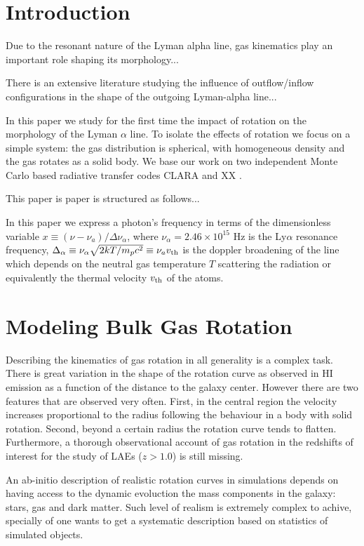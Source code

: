\documentclass[usenatbib]{mn2e}
\begin{document}
\section{Introduction}
\label{sec:intro}



Due to the resonant nature of the Lyman alpha line, gas kinematics
play an important role shaping its morphology...

There is an extensive literature studying the influence of
outflow/inflow configurations in the shape of the outgoing Lyman-alpha
line...

In this paper we study for the first time the impact of rotation on
the morphology of the Lyman $\alpha$ line. To isolate the effects of
rotation we focus on a simple system: the gas distribution is
spherical, with homogeneous density and the gas rotates as a solid
body. We base our work on two independent Monte Carlo based radiative
transfer codes CLARA \citep{CLARA} and XX \citep{DijkstraKramer}.

 
This paper is paper is structured as follows...

In this paper we express a photon's frequency in terms of the
dimensionless variable $x\equiv (\nu -\nu_a)/\Delta\nu_\alpha$, where
$\nu_{\alpha}=2.46\times 10^{15}$ Hz is the Ly$\alpha$ resonance
frequency,  $\Delta_{\alpha} \equiv
\nu_{\alpha}\sqrt{2kT/m_pc^2}\equiv \nu_av_{\rm th} $ is the doppler
broadening of the line which depends on the neutral gas temperature
$T$ scattering the radiation or equivalently the thermal velocity
$v_{\rm th}$ of the atoms.


\section{Modeling Bulk Gas Rotation}
\label{sec:implementation}

Describing the kinematics of gas rotation in all generality is a
complex task. There is great variation in the shape of the rotation
curve as observed in HI emission as a function of the distance to the
galaxy center. However there are two features that are observed very
often. First, in the central region the velocity increases
proportional to the radius following the behaviour in a body with
solid rotation. Second, beyond a certain radius the rotation curve
tends to flatten. Furthermore, a thorough observational account of gas
rotation in the redshifts of interest for the study of LAEs ($z>1.0$)
is still missing. 


An ab-initio description of realistic rotation curves in simulations
depends on having access to the dynamic evoluction the mass components
in the galaxy: stars, gas and dark matter. Such level of realism is
extremely complex to achive, specially of one wants to get a
systematic description based on statistics of simulated objects.
\end{document}
